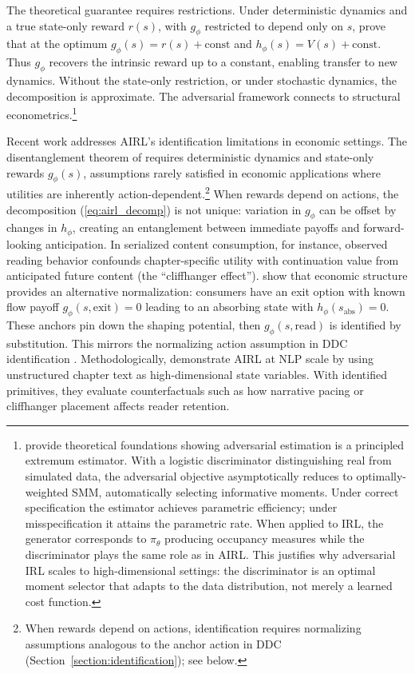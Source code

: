 The theoretical guarantee requires restrictions. Under deterministic dynamics and a true state-only reward $r(s)$, with $g_\phi$ restricted to depend only on $s$, \citet{fu:2018} prove that at the optimum $g_\phi(s) = r(s) + \text{const}$ and $h_\phi(s) = V(s) + \text{const}$. Thus $g_\phi$ recovers the intrinsic reward up to a constant, enabling transfer to new dynamics. Without the state-only restriction, or under stochastic dynamics, the decomposition is approximate. The adversarial framework connects to structural econometrics.\footnote{\footnotesize \citet{kaji:2023} provide theoretical foundations showing adversarial estimation is a principled extremum estimator. With a logistic discriminator distinguishing real from simulated data, the adversarial objective asymptotically reduces to optimally-weighted SMM, automatically selecting informative moments. Under correct specification the estimator achieves parametric efficiency; under misspecification it attains the parametric rate. When applied to IRL, the generator corresponds to $\pi_\theta$ producing occupancy measures while the discriminator plays the same role as in AIRL. This justifies why adversarial IRL scales to high-dimensional settings: the discriminator is an optimal moment selector that adapts to the data distribution, not merely a learned cost function.}

Recent work addresses AIRL's identification limitations in economic settings. The disentanglement theorem of \citet{fu:2018} requires deterministic dynamics and state-only rewards $g_\phi(s)$, assumptions rarely satisfied in economic applications where utilities are inherently action-dependent.\footnote{\footnotesize When rewards depend on actions, identification requires normalizing assumptions analogous to the anchor action in DDC (Section~\ref{section:identification}); see \citet{lee:2026} below.} When rewards depend on actions, the decomposition (\ref{eq:airl_decomp}) is not unique: variation in $g_\phi$ can be offset by changes in $h_\phi$, creating an entanglement between immediate payoffs and forward-looking anticipation. In serialized content consumption, for instance, observed reading behavior confounds chapter-specific utility with continuation value from anticipated future content (the ``cliffhanger effect''). \citet{lee:2026} show that economic structure provides an alternative normalization: consumers have an exit option with known flow payoff $g_\phi(s, \text{exit}) = 0$ leading to an absorbing state with $h_\phi(s_{\text{abs}}) = 0$. These anchors pin down the shaping potential, then $g_\phi(s, \text{read})$ is identified by substitution. This mirrors the normalizing action assumption in DDC identification \citep{rust:1994,magnacthesmar:2002}. Methodologically, \citet{lee:2026} demonstrate AIRL at NLP scale by using unstructured chapter text as high-dimensional state variables. With identified primitives, they evaluate counterfactuals such as how narrative pacing or cliffhanger placement affects reader retention.

